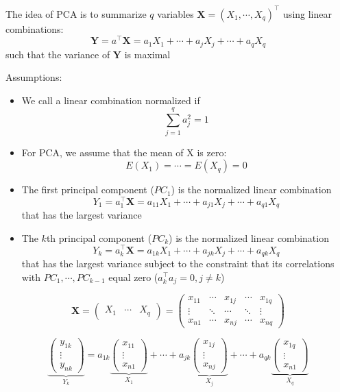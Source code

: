 \documentclass[a4paper]{article}
\begin{document}
The idea of PCA is to summarize $q$ variables $\mathbf{X}=(X_1,\cdots,X_q)^{\intercal}$ using linear combinations:
\begin{equation*}
    \mathbf{Y}=a^{\intercal}\mathbf{X}=a_1X_1+\cdots+a_jX_j+\cdots+a_qX_q
\end{equation*}
such that the variance of $\mathbf{Y}$ is maximal

Assumptions:
\begin{itemize}
    \item We call a linear combination normalized if
    \[\sum_{j=1}^{q}a_j^2=1 \]
    \item For PCA, we assume that the mean of X is zero:
    \[E(X_1)=\cdots=E(X_q)=0 \]
    \item The first principal component ($PC_1$) is the normalized linear combination
    \[Y_1=a_1^{\intercal}\mathbf{X}=a_{11}X_1+\cdots+a_{j1}X_j+\cdots+a_{q1}X_q \]
    that has the largest variance
    \item The $k$th principal component ($PC_k$) is the normalized linear combination
    \[Y_k=a_k^{\intercal}\mathbf{X}=a_{1k}X_1+\cdots+a_{jk}X_j+\cdots+a_{qk}X_q \]
    that has the largest variance subject to the constraint that its correlations with $PC_1,\cdots,PC_{k-1}$ equal zero ($a_k^{\intercal}a_j=0,j\neq k$)
\end{itemize}

\begin{equation*}
    \mathbf{X}=
    \begin{pmatrix}
    X_1 & \cdots & X_q
    \end{pmatrix}
    =
    \begin{pmatrix}
    x_{11} & \cdots & x_{1j} & \cdots & x_{1q} \\
    \vdots & \ddots & \cdots & \ddots & \vdots \\
    x_{n1} & \cdots & x_{nj} & \cdots & x_{nq}
    \end{pmatrix}
\end{equation*}

\begin{equation*}
    \underbrace{
    \begin{pmatrix}
    y_{1k} \\ \vdots \\ y_{nk}
    \end{pmatrix}
    }_{Y_k}
    =
    a_{1k}
    \underbrace{
    \begin{pmatrix}
    x_{11} \\ \vdots \\ x_{n1} 
    \end{pmatrix}
    }_{X_1}
    + \cdots + 
    a_{jk}
    \underbrace{
    \begin{pmatrix}
    x_{1j} \\ \vdots \\ x_{nj} 
    \end{pmatrix}
    }_{X_j}
    + \cdots + 
    a_{qk}
    \underbrace{
    \begin{pmatrix}
    x_{1q} \\ \vdots \\ x_{n1} 
    \end{pmatrix}
    }_{X_q}
\end{equation*}
\end{document}
